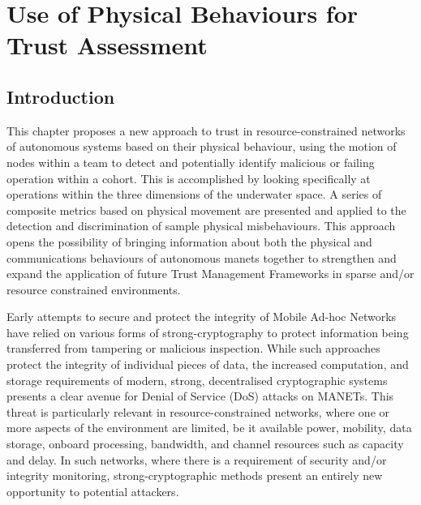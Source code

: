 \def\ChapterTitle{Use of Physical Behaviours for Trust Assessment}

	\chapter{\ChapterTitle}
	\label{Chapter\thechapter}

\section{Introduction}

This chapter proposes a new approach to trust in resource-constrained networks of autonomous systems based on their physical behaviour, using the motion of nodes within a team to detect and potentially identify malicious or failing operation within a cohort.
This is accomplished by looking specifically at operations within the three dimensions of the underwater space.
A series of composite metrics based on physical movement are presented and applied to the detection and discrimination of sample physical misbehaviours.
This approach opens the possibility of bringing information about both the physical and communications behaviours of autonomous \glspl{manet} together to strengthen and expand the application of future Trust Management Frameworks in sparse and/or resource constrained environments.

Early attempts to secure and protect the integrity of Mobile Ad-hoc Networks have relied on various forms of strong-cryptography to protect information being transferred from tampering or malicious inspection.
While such approaches protect the integrity of individual pieces of data, the increased computation, and storage requirements of modern, strong, decentralised cryptographic systems presents a clear avenue for Denial of Service (DoS) attacks on MANETs.
This threat is particularly relevant in resource-constrained networks, where one or more aspects of the environment are limited, be it available power, mobility, data storage, onboard processing, bandwidth, and channel resources such as capacity and delay.
In such networks, where there is a requirement of security and/or integrity monitoring, strong-cryptographic methods present an entirely new opportunity to potential attackers.

